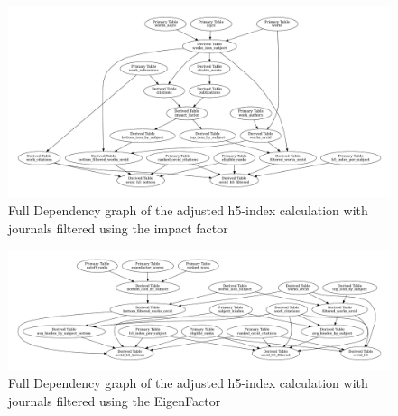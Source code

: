 \begin{figure}[H]
    \centering
    \includegraphics[width=\textwidth]{../figs/full-graph_jif.pdf}
    \caption{Full Dependency graph of the adjusted h5-index calculation with journals filtered using the impact factor}
    \label{fig:dependency_graph_jif}
\end{figure}

\begin{figure}[H]
    \centering
    \includegraphics[width=\textwidth]{../figs/full-graph_ef.pdf}
    \caption{Full Dependency graph of the adjusted h5-index calculation with journals filtered using the EigenFactor}
    \label{fig:dependency_graph_ef}
\end{figure}


